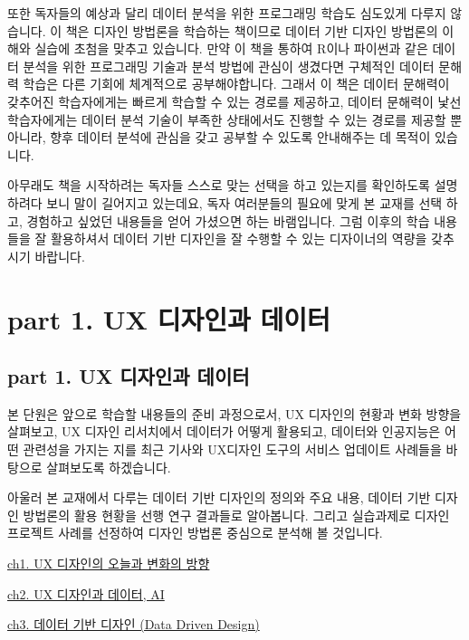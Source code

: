 \documentclass[
  letterpaper,
]{book}
\begin{document}
또한 독자들의 예상과 달리 데이터 분석을 위한 프로그래밍 학습도 심도있게
다루지 않습니다. 이 책은 디자인 방법론을 학습하는 책이므로 데이터 기반
디자인 방법론의 이해와 실습에 초첨을 맞추고 있습니다. 만약 이 책을
통하여 R이나 파이썬과 같은 데이터 분석을 위한 프로그래밍 기술과 분석
방법에 관심이 생겼다면 구체적인 데이터 문해력 학습은 다른 기회에
체계적으로 공부해야합니다. 그래서 이 책은 데이터 문해력이 갖추어진
학습자에게는 빠르게 학습할 수 있는 경로를 제공하고, 데이터 문해력이 낯선
학습자에게는 데이터 분석 기술이 부족한 상태에서도 진행할 수 있는 경로를
제공할 뿐 아니라, 향후 데이터 분석에 관심을 갖고 공부할 수 있도록
안내해주는 데 목적이 있습니다.

아무래도 책을 시작하려는 독자들 스스로 맞는 선택을 하고 있는지를
확인하도록 설명하려다 보니 말이 길어지고 있는데요, 독자 여러분들의
필요에 맞게 본 교재를 선택 하고, 경험하고 싶었던 내용들을 얻어 가셨으면
하는 바램입니다. 그럼 이후의 학습 내용들을 잘 활용하셔서 데이터 기반
디자인을 잘 수행할 수 있는 디자이너의 역량을 갖추시기 바랍니다.

\part{\textbf{part 1. UX 디자인과 데이터}}

\chapter{part 1. UX 디자인과
데이터}\label{part-1.-ux-uxb514uxc790uxc778uxacfc-uxb370uxc774uxd130-1}

본 단원은 앞으로 학습할 내용들의 준비 과정으로서, UX 디자인의 현황과
변화 방향을 살펴보고, UX 디자인 리서치에서 데이터가 어떻게 활용되고,
데이터와 인공지능은 어떤 관련성을 가지는 지를 최근 기사와 UX디자인
도구의 서비스 업데이트 사례들을 바탕으로 살펴보도록 하겠습니다.

아울러 본 교재에서 다루는 데이터 기반 디자인의 정의와 주요 내용, 데이터
기반 디자인 방법론의 활용 현황을 선행 연구 결과들로 알아봅니다. 그리고
실습과제로 디자인 프로젝트 사례를 선정하여 디자인 방법론 중심으로 분석해
볼 것입니다.

\href{ch1.\%20UX\%20디자인의\%20오늘과\%20변화의\%20방향.qmd}{ch1. UX
디자인의 오늘과 변화의 방향}

\href{ch2.\%20UX\%20디자인과\%20데이터,\%20AI.qmd}{ch2. UX 디자인과
데이터, AI}

\href{ch3.\%20데이터\%20기반\%20디자인\%20(Data\%20Driven\%20Design).qmd}{ch3.
데이터 기반 디자인 (Data Driven Design)}
\end{document}
